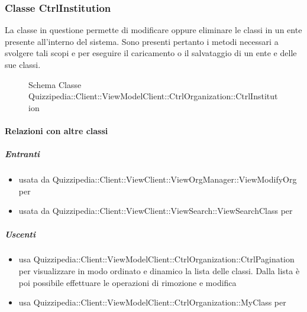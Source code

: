 \subsubsection{Classe CtrlInstitution}
La classe in questione permette di modificare oppure eliminare le classi in un ente presente all'interno del sistema.
Sono presenti pertanto i metodi necessari a svolgere tali scopi e per eseguire il caricamento o il salvataggio di un ente e delle sue classi.
\begin{figure}[H]
\centering
\noindent{}
\caption[Schema Classe CtrlInstitution]{Schema Classe Quizzipedia::Client::ViewModelClient::CtrlOrganization::CtrlInstitution}
\end{figure}
\paragraph{Relazioni con altre classi}
\subparagraph{Entranti}
\begin{itemize}
\item usata da Quizzipedia::Client::ViewClient::ViewOrgManager::ViewModifyOrg per 
\item usata da Quizzipedia::Client::ViewClient::ViewSearch::ViewSearchClass per 
\end{itemize}
\subparagraph{Uscenti}
\begin{itemize}
\item usa Quizzipedia::Client::ViewModelClient::CtrlOrganization::CtrlPagination per visualizzare in modo ordinato e dinamico la lista delle classi. Dalla lista è poi possibile effettuare le operazioni di rimozione e modifica
\item usa Quizzipedia::Client::ViewModelClient::CtrlOrganization::MyClass per 
\end{itemize}
